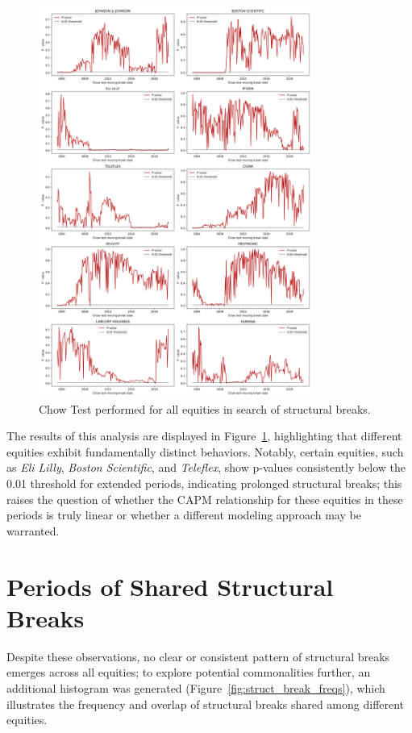 \begin{figure}[h!]
    \centering
    \includegraphics[width=0.8\textwidth]{images/chowmoving.png}
    \caption{Chow Test performed for all equities in search of structural breaks.}\label{fig:chowmoving}
\end{figure}

The results of this analysis are displayed in Figure~\ref{fig:chowmoving}, highlighting that different equities exhibit 
fundamentally distinct behaviors. 
Notably, certain equities, such as \textit{Eli Lilly}, \textit{Boston Scientific}, and \textit{Teleflex}, show p-values
consistently below the 0.01 threshold for extended periods, indicating prolonged structural breaks; this raises the question
of whether the CAPM relationship for these equities in these periods is truly linear or whether a different modeling approach
may be warranted.

\section{Periods of Shared Structural Breaks}

Despite these observations, no clear or consistent pattern of structural breaks emerges across all equities; to explore 
potential commonalities further, an additional histogram was generated (Figure~\ref{fig:struct_break_freqs}), which illustrates
the frequency and overlap of structural breaks shared among different equities.

